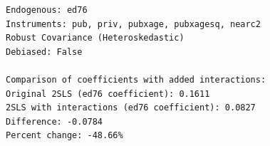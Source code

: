 \documentclass[10pt]{article}
\begin{document}
\begin{verbatim}
Endogenous: ed76
Instruments: pub, priv, pubxage, pubxagesq, nearc2
Robust Covariance (Heteroskedastic)
Debiased: False

Comparison of coefficients with added interactions:
Original 2SLS (ed76 coefficient): 0.1611
2SLS with interactions (ed76 coefficient): 0.0827
Difference: -0.0784
Percent change: -48.66%
\end{verbatim}
\end{document}
